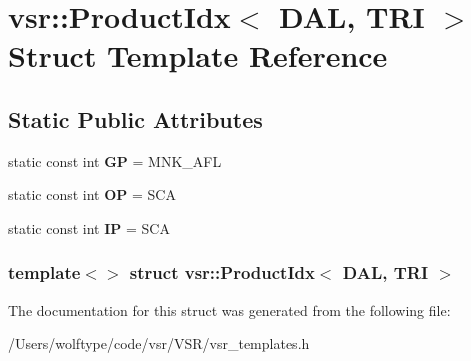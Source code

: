 \hypertarget{structvsr_1_1_product_idx_3_01_d_a_l_00_01_t_r_i_01_4}{\section{vsr\-:\-:Product\-Idx$<$ D\-A\-L, T\-R\-I $>$ Struct Template Reference}
\label{structvsr_1_1_product_idx_3_01_d_a_l_00_01_t_r_i_01_4}
}
\subsection*{Static Public Attributes}
\begin{DoxyCompactItemize}
\item 
\hypertarget{structvsr_1_1_product_idx_3_01_d_a_l_00_01_t_r_i_01_4_a84d830208159a6d8afb410a282ddc7a8}{static const int {\bfseries G\-P} = M\-N\-K\-\_\-\-A\-F\-L}\label{structvsr_1_1_product_idx_3_01_d_a_l_00_01_t_r_i_01_4_a84d830208159a6d8afb410a282ddc7a8}

\item 
\hypertarget{structvsr_1_1_product_idx_3_01_d_a_l_00_01_t_r_i_01_4_aa0ffd027008a4c0af284871ab8a172bc}{static const int {\bfseries O\-P} = S\-C\-A}\label{structvsr_1_1_product_idx_3_01_d_a_l_00_01_t_r_i_01_4_aa0ffd027008a4c0af284871ab8a172bc}

\item 
\hypertarget{structvsr_1_1_product_idx_3_01_d_a_l_00_01_t_r_i_01_4_acad50845390422e4c48768249594cb66}{static const int {\bfseries I\-P} = S\-C\-A}\label{structvsr_1_1_product_idx_3_01_d_a_l_00_01_t_r_i_01_4_acad50845390422e4c48768249594cb66}

\end{DoxyCompactItemize}
\subsubsection*{template$<$$>$ struct vsr\-::\-Product\-Idx$<$ D\-A\-L, T\-R\-I $>$}



The documentation for this struct was generated from the following file\-:\begin{DoxyCompactItemize}
\item 
/\-Users/wolftype/code/vsr/\-V\-S\-R/vsr\-\_\-templates.\-h\end{DoxyCompactItemize}
